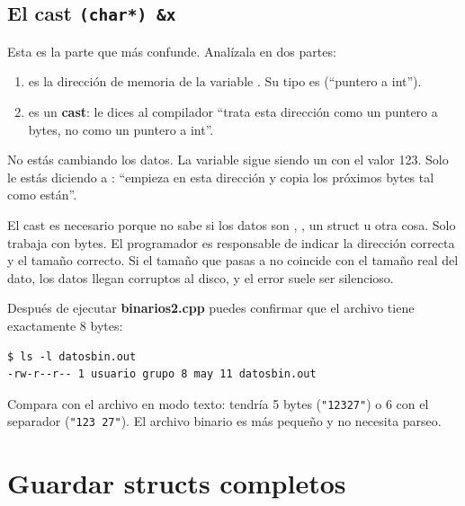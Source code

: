 \documentclass[12pt, oneside]{article}
\begin{document}
\subsection{El cast \texttt{(char*) \&x}}

Esta es la parte que más confunde.  Analízala en dos partes:

\begin{enumerate}
  \item {} es la dirección de memoria de la variable .
        Su tipo es  (``puntero a int'').
  \item {} es un \textbf{cast}: le dices al compilador
        ``trata esta dirección como un puntero a bytes, no como un
        puntero a int''.
\end{enumerate}

No estás cambiando los datos.  La variable  sigue siendo un
 con el valor 123.  Solo le estás diciendo a :
``empieza en esta dirección y copia los próximos  bytes
tal como están''.

\begin{advertencia}
  El cast  es necesario porque  no sabe si los
  datos son , , un struct u otra cosa.  Solo trabaja
  con bytes.  El programador es responsable de indicar la dirección
  correcta y el tamaño correcto.  Si el tamaño que pasas a 
  no coincide con el tamaño real del dato, los datos llegan corruptos
  al disco, y el error suele ser silencioso.
\end{advertencia}

\begin{ejemplo}
  Después de ejecutar \textbf{binarios2.cpp} puedes confirmar que el
  archivo tiene exactamente 8 bytes:
  \begin{verbatim}
$ ls -l datosbin.out
-rw-r--r-- 1 usuario grupo 8 may 11 datosbin.out
  \end{verbatim}
  Compara con el archivo en modo texto: tendría 5 bytes (\texttt{"12327"})
  o 6 con el separador (\texttt{"123 27"}).  El archivo binario es más
  pequeño y no necesita parseo.
\end{ejemplo}

\section{Guardar structs completos}
\end{document}
